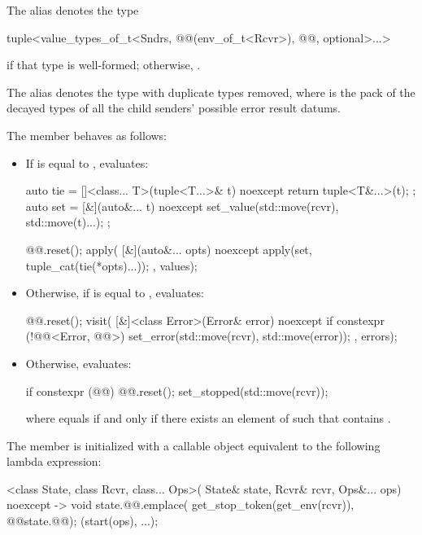 \pnum
The alias  denotes the type
\begin{codeblock}
tuple<value_types_of_t<Sndrs, @@(env_of_t<Rcvr>), @@, optional>...>
\end{codeblock}
if that type is well-formed; otherwise, .

\pnum
The alias  denotes
the type 
with duplicate types removed,
where  is the pack of the decayed types
of all the child senders' possible error result datums.

\pnum
The member
behaves as follows:
\begin{itemize}
\item
If  is equal to ,
evaluates:
\begin{codeblock}
auto tie = []<class... T>(tuple<T...>& t) noexcept { return tuple<T&...>(t); };
auto set = [&](auto&... t) noexcept { set_value(std::move(rcvr), std::move(t)...); };

@@.reset();
apply(
  [&](auto&... opts) noexcept {
    apply(set, tuple_cat(tie(*opts)...));
  },
  values);
\end{codeblock}
\item
Otherwise,
if  is equal to ,
evaluates:
\begin{codeblock}
@@.reset();
visit(
  [&]<class Error>(Error& error) noexcept {
    if constexpr (!@@<Error, @@>) {
      set_error(std::move(rcvr), std::move(error));
    }
  },
  errors);
\end{codeblock}
\item
Otherwise, evaluates:
\begin{codeblock}
if constexpr (@@) {
  @@.reset();
  set_stopped(std::move(rcvr));
}
\end{codeblock}
where  equals 
if and only if there exists an element  of  such that
contains .
\end{itemize}

\pnum
The member 
is initialized with a callable object
equivalent to the following lambda expression:
\begin{codeblock}
[]<class State, class Rcvr, class... Ops>(
    State& state, Rcvr& rcvr, Ops&... ops) noexcept -> void {
  state.@@.emplace(
    get_stop_token(get_env(rcvr)),
    @@{state.@@});
  (start(ops), ...);
}
\end{codeblock}

